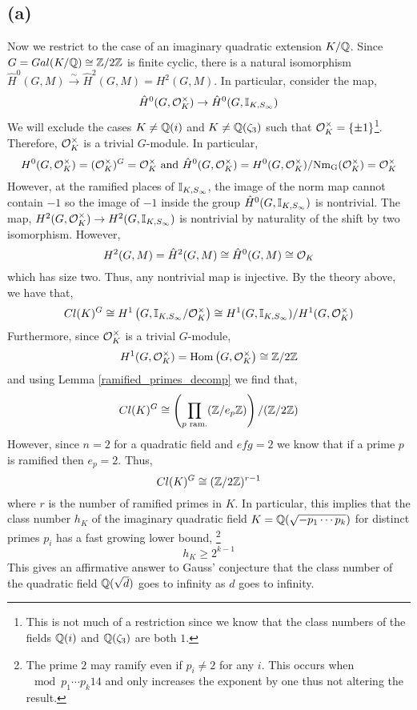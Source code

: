 \documentclass[12pt]{extarticle}
\begin{document}
\subsection*{(a)}
Now we restrict to the case of an imaginary quadratic extension $K / \mathbb{Q}$. Since $G = Gal \small(K/\mathbb{Q} \small) \cong \mathbb{Z} / 2 \mathbb{Z}$ is finite cyclic, there is a natural isomorphism $\hat{H}^0(G, M) \xrightarrow{\sim} \hat{H}^2(G, M) = H^2(G, M)$. In particular, consider the map,
\[ \hat{H}^0(G, \mathcal{O}_{K}^\times) \to \hat{H}^0(G, \mathbb{I}_{K, S_\infty}) \]
We will exclude the cases $K \neq \mathbb{Q}(i)$ and $K \neq \mathbb{Q}(\zeta_3)$ such that $\mathcal{O}_{K}^\times = \{ \pm 1 \}$\footnote{This is not much of a restriction since we know that the class numbers of the fields $\mathbb{Q}(i)$ and $\mathbb{Q}(\zeta_3)$ are both $1$.}. Therefore, $\mathcal{O}_{K}^\times$ is a trivial $G$-module. In particular,
\[ H^0(G, \mathcal{O}_{K}^\times) = (\mathcal{O}_{K}^\times)^G = \mathcal{O}_{K}^\times \text{ and } \hat{H}^0(G, \mathcal{O}_{K}^\times) = H^0(G, \mathcal{O}_{K}^\times) / \mathrm{Nm_G}(\mathcal{O}_{K}^\times) = \mathcal{O}_{K}^\times \] 
However, at the ramified places of $\mathbb{I}_{K, S_\infty}$, the image of the norm map cannot contain $-1$ so the image of $-1$ inside the group $\hat{H}^0(G, \mathbb{I}_{K, S_\infty})$ is nontrivial. The map,
$H^2(G, \mathcal{O}_{K}^\times) \to H^2(G, \mathbb{I}_{K, S_\infty})$
is nontrivial by naturality of the shift by two isomorphism. However, \[H^2(G, M) = \hat{H}^2(G, M)\cong \hat{H}^0(G, M) \cong \mathcal{O}_{K}\]
 which has size two. Thus, any nontrivial map is injective. By the theory above, we have that,
\[ Cl(K)^G \cong H^1\left(G, \mathbb{I}_{K, S_\infty} / \mathcal{O}_{K}^\times \right) \cong H^1(G, \mathbb{I}_{K, S_\infty}) / H^1(G, \mathcal{O}_{K}^\times) \] 
Furthermore, since $\mathcal{O}_{K}^\times$ is a trivial $G$-module,
\[ H^1(G, \mathcal{O}_{K}^\times) = \mathrm{Hom}\left(G, \mathcal{O}_{K}^\times\right) \cong \mathbb{Z} / 2 \mathbb{Z} \]
and using Lemma \ref{ramified_primes_decomp} we find that,
\[ Cl(K)^G \cong \left( \prod_{p \text{ ram.}} (\mathbb{Z} / e_{p} \mathbb{Z}) \right) / (\mathbb{Z} / 2 \mathbb{Z}) \]
However, since $n = 2$ for a quadratic field and $efg = 2$ we know that if a prime $p$ is ramified then $e_p = 2$. Thus,
\[ Cl(K)^G \cong (\mathbb{Z} / 2 \mathbb{Z})^{r - 1} \]
where $r$ is the number of ramified primes in $K$. In particular, this implies that the class number $h_K$ of the imaginary quadratic field $K = \mathbb{Q}(\sqrt{- p_1 \cdots p_k})$ for distinct primes $p_i$ has a fast growing lower bound, \footnote{The prime $2$ may ramify even if $p_i \neq 2$ for any $i$. This occurs when $\mod{p_1 \cdots p_k}{1}{4}$ and only increases the exponent by one thus not altering the result.} 
\[ h_K \ge 2^{k - 1} \] 
This gives an affirmative answer to Gauss' conjecture that the class number of the quadratic field $\mathbb{Q}(\sqrt{d})$ goes to infinity as $d$ goes to infinity.
\end{document}
